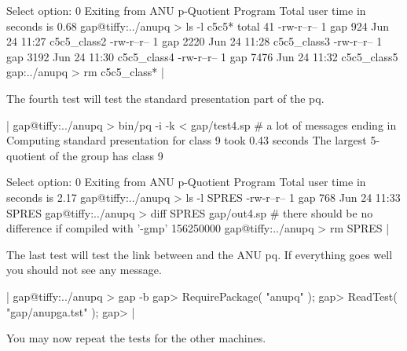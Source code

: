     Select option: 0 
    Exiting from ANU p-Quotient Program
    Total user time in seconds is 0.68
    gap@tiffy:../anupq > ls -l c5c5*
    total 41
    -rw-r--r--    1 gap     924 Jun 24 11:27 c5c5_class2
    -rw-r--r--    1 gap    2220 Jun 24 11:28 c5c5_class3
    -rw-r--r--    1 gap    3192 Jun 24 11:30 c5c5_class4
    -rw-r--r--    1 gap    7476 Jun 24 11:32 c5c5_class5
    gap:../anupq > rm c5c5_class* |

The fourth test will test the standard presentation part of the pq.

|    gap@tiffy:../anupq > bin/pq -i -k < gap/test4.sp
    # a lot of messages ending in
    Computing standard presentation for class 9 took 0.43 seconds
    The largest 5-quotient of the group has class 9

    Select option: 0 
    Exiting from ANU p-Quotient Program
    Total user time in seconds is 2.17
    gap@tiffy:../anupq > ls -l SPRES
    -rw-r--r--  1 gap     768 Jun 24 11:33 SPRES
    gap@tiffy:../anupq > diff SPRES gap/out4.sp
    # there should be no difference if compiled with '-gmp'
    156250000
    gap@tiffy:../anupq > rm SPRES |

The last  test  will test the  link  between {\GAP} and   the ANU pq.  If
everything goes well you should not see any message.

|    gap@tiffy:../anupq > gap -b
    gap> RequirePackage( "anupq" );
    gap> ReadTest( "gap/anupga.tst" );
    gap> |

You may now repeat the tests for the other machines.

